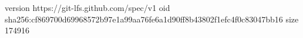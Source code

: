 version https://git-lfs.github.com/spec/v1
oid sha256:cf869700d69968572b97e1a99aa76fe6a1d90ff8b43802f1efc4f0c83047bb16
size 174916
